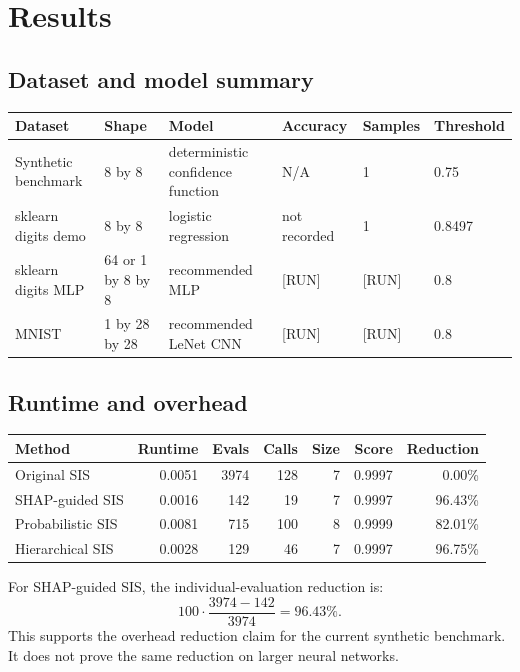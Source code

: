 \documentclass[11pt]{article}
\begin{document}
\section{Results}
\subsection{Dataset and model summary}
\begin{table}[h]
\centering
\small
\begin{tabular}{llllll}
\toprule
Dataset & Shape & Model & Accuracy & Samples & Threshold \\
\midrule
Synthetic benchmark & 8 by 8 & deterministic confidence function & N/A & 1 & 0.75 \\
sklearn digits demo & 8 by 8 & logistic regression & not recorded & 1 & 0.8497 \\
sklearn digits MLP & 64 or 1 by 8 by 8 & recommended MLP & [RUN] & [RUN] & 0.8 \\
MNIST & 1 by 28 by 28 & recommended LeNet CNN & [RUN] & [RUN] & 0.8 \\
\bottomrule
\end{tabular}
\end{table}

\subsection{Runtime and overhead}
\begin{table}[h]
\centering
\small
\begin{tabular}{lrrrrrr}
\toprule
Method & Runtime & Evals & Calls & Size & Score & Reduction \\
\midrule
Original SIS & 0.0051 & 3974 & 128 & 7 & 0.9997 & 0.00\% \\
SHAP-guided SIS & 0.0016 & 142 & 19 & 7 & 0.9997 & 96.43\% \\
Probabilistic SIS & 0.0081 & 715 & 100 & 8 & 0.9999 & 82.01\% \\
Hierarchical SIS & 0.0028 & 129 & 46 & 7 & 0.9997 & 96.75\% \\
\bottomrule
\end{tabular}
\end{table}

For SHAP-guided SIS, the individual-evaluation reduction is:
\[
100 \cdot \frac{3974 - 142}{3974} = 96.43\%.
\]
This supports the overhead reduction claim for the current synthetic benchmark. It does not prove the same reduction on larger neural networks.
\end{document}
